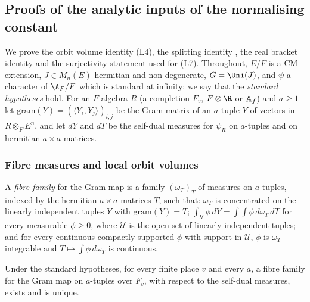 \subsection{Proofs of the analytic inputs of the normalising constant}\label{pf:multnc:sec-ncproofs}

We prove the orbit volume identity (L4), the splitting identity , the real bracket identity
 and the surjectivity statement used for (L7). Throughout, $E/F$ is a CM extension, $J\in M_n(E)$ hermitian and
non-degenerate, $G=\Uni(J)$, and $\psi$ a character of $\A_F/F$ which is standard at infinity; we say that the
\emph{standard hypotheses} hold. For an $F$-algebra $R$ (a completion $F_v$, $F\otimes\R$ or $\mathbb{A}_{f}$) and $a\ge1$ let
$\mathrm{gram}(Y)=(\langle Y_i,Y_j\rangle)_{i,j}$ be the Gram matrix of an $a$-tuple $Y$ of vectors in $R\otimes_FE^n$, and
let $dY$ and $dT$ be the self-dual measures for $\psi_R$ on $a$-tuples and on hermitian $a\times a$ matrices.

\subsubsection*{Fibre measures and local orbit volumes}

A \emph{fibre family} for the Gram map is a family $(\omega_T)_T$ of measures on $a$-tuples, indexed by the hermitian
$a\times a$ matrices $T$, such that: $\omega_T$ is concentrated on the linearly independent tuples $Y$ with
$\mathrm{gram}(Y)=T$; $\int_{\mathcal U}\phi\,dY=\int\!\int\phi\,d\omega_T\,dT$ for every measurable $\phi\ge0$, where
$\mathcal U$ is the open set of linearly independent tuples; and for every continuous compactly supported $\phi$ with support
in $\mathcal U$, $\phi$ is $\omega_T$-integrable and $T\mapsto\int\phi\,d\omega_T$ is continuous.

\begin{lemma}\label{pf:multnc:omunique}
Under the standard hypotheses, for every finite place $v$ and every $a$, a fibre family for the Gram map on $a$-tuples
over $F_v$, with respect to the self-dual measures, exists and is unique.
\end{lemma}

